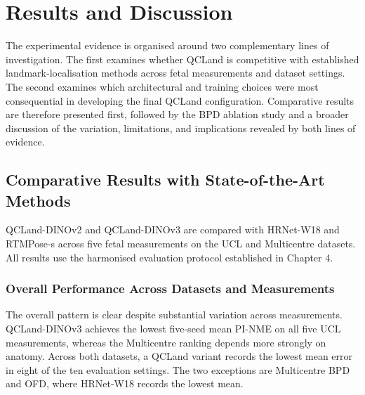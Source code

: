 \chapter{Results and Discussion}
\label{chap:results}

The experimental evidence is organised around two complementary
lines of investigation. The first examines whether QCLand is competitive
with established landmark-localisation methods across fetal
measurements and dataset settings. The second examines which
architectural and training choices were most consequential in
developing the final QCLand configuration. Comparative results are therefore presented
first, followed by the BPD ablation study and a broader discussion of
the variation, limitations, and implications revealed by both lines
of evidence.



\section{Comparative Results with State-of-the-Art Methods}
\label{sec:results-comparative}
\label{sec:results-track-b}

QCLand-DINOv2 and QCLand-DINOv3 are compared with HRNet-W18 and
RTMPose-s across five fetal measurements on the UCL and Multicentre
datasets. All results use the harmonised evaluation protocol
established in Chapter 4.


\subsection{Overall Performance Across Datasets and Measurements}
\label{sec:results-overall}
\label{sec:results-cross-anatomy}
\label{sec:results-hrnet512}

The overall pattern is clear despite substantial variation across
measurements. QCLand-DINOv3 achieves the lowest five-seed mean PI-NME
on all five UCL measurements, whereas the Multicentre ranking depends
more strongly on anatomy. Across both datasets, a QCLand variant
records the lowest mean error in eight of the ten evaluation settings.
The two exceptions are Multicentre BPD and OFD, where HRNet-W18
records the lowest mean.

